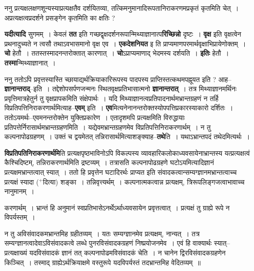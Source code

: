 \documentclass[article,12pt,a4paper]{memoir}
\newcommand{\add}[1]{($^{+}$#1)}
\begin{document}
	  \pstart ननु प्रत्यक्षलक्षणशून्यस्याप्रत्यक्षतैव दर्शयितव्या, तत्किमनुमानादिरूपतानिराकरणमप्रकृतं कृतमिति चेत् । अप्रत्यक्षत्वप्रदर्शने प्रसङ्गेन कृतमिति का क्षतिः ?
	\pend
      

	  \pstart \textbf{यदीत्यादि} सुगमम् । केवलं \textbf{तत} इति गच्छद्वृक्षदर्शनरूपान्मिथ्याज्ञानात्प\textbf{रिच्छिन्नो} दृष्टः । \textbf{वृक्ष} इति वृक्षत्वेन प्रथनादुच्यते न त्वसौ तथाऽवभासमानो वृक्ष एव । \textbf{एकदेशनियत} इ ति प्राप्यमाणपरमार्थवृक्षाभिप्रायेणोक्तम् । \textbf{चो} हेतौ । ततस्तस्मादनन्तरोक्तात् कारणात् । \textbf{चो}ऽप्राप्यमाणाद् भेदमस्य दर्शयति । \textbf{इतिः} हेतौ । \textbf{तस्मा}न्मिथ्याज्ञानात् ।
	\pend
      

	  \pstart ननु ततोऽपि प्रवृत्तस्यास्ति च्छायाद्यर्थक्रियाकारिरूपस्य पादपस्य प्राप्तिस्तत्कथमपह्नूयत इति ? आह--\textbf{ज्ञानान्तराद्}--इति । तद्देशोपसर्पणजन्मनः स्थितवृक्षप्रतिभासात्मनो \textbf{ज्ञानान्तरात्} । तत्र मिथ्याज्ञानमर्थिनः प्रवृत्तिमात्रहेतुर्न तु वृक्षप्रापकमिति संक्षेपार्थः । यदि मिथ्याज्ञानत्वप्रतिपादनार्थमभ्रान्तग्रहणं न तर्हि विप्रतिपत्तिनिराकरणार्थमित्याह--\textbf{एवम्} इति । \textbf{एव}मित्यनेनानन्तरोक्तस्योपपत्तिप्रकारस्याकारो दर्शितः । ततोऽयमर्थः--एवमनन्तरोक्तेन युक्तिप्रकारेण । एतादृशमपि प्रत्यक्षमिति विरुद्धायाः प्रतिपत्तेर्निरासार्थमभ्रान्तग्रहणमिति । यद्येवमभ्रान्तग्रहणमेव विप्रतिपत्तिनिराकरणार्थम् । न तु कल्पनापोढग्रहणम् । उक्तं च द्वयमेतत् तन्निरासार्थमित्याशङ्क्याह--\textbf{तथे}ति । यथाऽभ्रान्तपदं तथेदमित्यर्थः ।
	\pend
      

	  \pstart \textbf{विप्रतिपतिनिराकरणार्थमि}ति प्रत्यक्षपृष्ठभाविनोऽपि विकल्पस्य व्यावहारिकलोकाध्यवसायेनाभ्रान्तस्य यत्प्रत्यक्षत्वं कैश्चिदिष्टम्, तन्नि\leavevmode{}राकरणार्थमिति द्रष्टव्यम् । तत्रासति कल्पनापोढग्रहणे घटोऽयमित्यादिज्ञानं प्रत्यक्षमभ्रान्तत्वात् स्यात् । ततो हि प्रवृत्तेन घटादिरर्थः प्राप्यत इति संवादकत्वान्सम्यग्ज्ञानमभ्रान्तत्वाच्च प्रत्यक्षं स्यादा \add{दित्या} शङ्का । तन्निवृत्त्यर्थम् । कल्पनात्मकत्वान्न प्रत्यक्षम्, त्रिरूपलिङ्गजत्वाभावाच्च नानुमानम् ।  \leavevmode{} 
	  
	करणार्थम् । भ्रान्तं हि अनुमानं स्वप्रतिभासेऽनर्थेऽर्थाध्यवसायेन प्रवृत्तत्वात् । प्रत्यक्षं तु ग्राह्ये रूपे न विपर्यस्तम् ।  
	  
	न तु अविसंवादकमभ्रान्तमिह ग्रहीतव्यम् । यतः सम्यग्ज्ञानमेव प्रत्यक्षम्, नान्यत् । तत्र सम्यग्ज्ञानत्वादेवाऽविसंवादकत्वे लब्धे पुनरविसंवादकग्रहणं निष्प्रयोजनमेव । एवं हि वाक्यार्थः स्यात्--प्रत्यक्षाख्यं यदविसंवादकं ज्ञानं तत् कल्पनापोढमविसंवादकं चेति । न चानेन द्विरविसंवादकग्रहणेन किञ्चित् । तस्माद् ग्राह्येऽर्थक्रियाक्षमे वस्तुरूपे यदविपर्यस्तं तदभ्रान्तमिह वेदितव्यम् ॥  
	  
\end{document}

